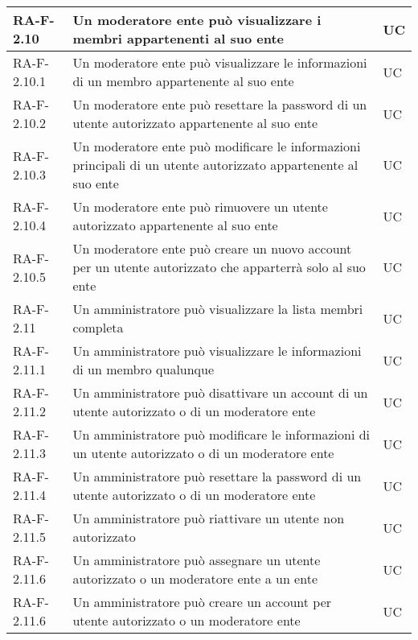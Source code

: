 \begin{center}
\begin{longtable}{|p{3cm}|p{9.85cm}|p{2cm}|}
		{\color{gray} RA-F-}2.10 & Un moderatore ente può visualizzare i membri appartenenti al suo ente & UC \\ \hline
		{\color{gray} RA-F-}2.10.1 & Un moderatore ente può visualizzare le informazioni di un membro appartenente al suo ente & UC \\ \hline
		{\color{gray} RA-F-}2.10.2 & Un moderatore ente può resettare la password di un utente autorizzato appartenente al suo ente & UC \\ \hline
		{\color{gray} RA-F-}2.10.3 & Un moderatore ente può modificare le informazioni principali di un utente autorizzato appartenente al suo ente & UC \\ \hline
		{\color{gray} RA-F-}2.10.4 & Un moderatore ente può rimuovere un utente autorizzato appartenente al suo ente & UC \\ \hline
		{\color{gray} RA-F-}2.10.5 & Un moderatore ente può creare un nuovo account per un utente autorizzato che apparterrà solo al suo ente & UC \\ \hline

		{\color{gray} RA-F-}2.11 & Un amministratore può visualizzare la lista membri completa & UC \\ \hline
		{\color{gray} RA-F-}2.11.1 & Un amministratore può visualizzare le informazioni di un membro qualunque & UC \\ \hline
		{\color{gray} RA-F-}2.11.2 & Un amministratore può disattivare un account di un utente autorizzato o di un moderatore ente & UC \\ \hline
		{\color{gray} RA-F-}2.11.3 & Un amministratore può modificare le informazioni di un utente autorizzato o di un moderatore ente & UC \\ \hline
		{\color{gray} RA-F-}2.11.4 & Un amministratore può resettare la password di un utente autorizzato o di un moderatore ente & UC \\ \hline
		{\color{gray} RA-F-}2.11.5 & Un amministratore può riattivare un utente non autorizzato & UC \\ \hline
		{\color{gray} RA-F-}2.11.6 & Un amministratore può assegnare un utente autorizzato o un moderatore ente a un ente & UC \\ \hline
		{\color{gray} RA-F-}2.11.6 & Un amministratore può creare un account per utente autorizzato o un moderatore ente & UC \\ \hline



\end{longtable}
\end{center}
